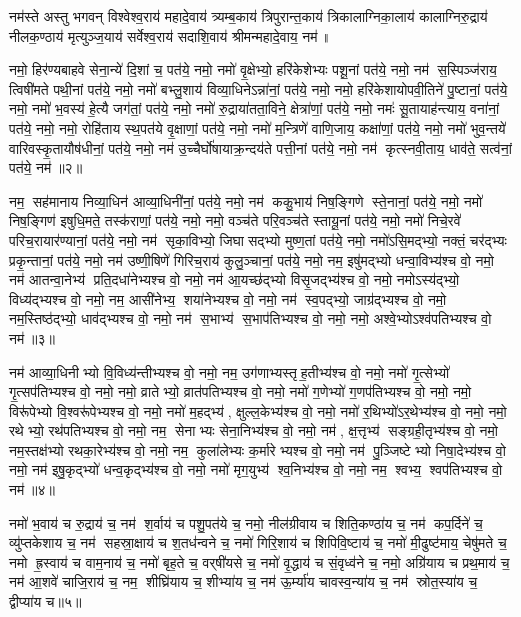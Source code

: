  
\lbrack नम॑स्ते अस्तु भगवन् विश्वेश्व॒राय॑ महादे॒वाय॑ त्र्यम्ब॒काय॑ त्रिपुरान्त॒काय॑ त्रिका\lbrack ला\rbrack ग्निका॒लाय॑ कालाग्निरु॒द्राय॑ नीलक॒ण्ठाय॑ मृत्युञ्ज॒याय॑ सर्वेश्व॒राय॑ सदाशि॒वाय॑ श्रीमन्महादे॒वाय॒ नम॑॥\rbrack

नमो॒ हिर॑ण्यबाहवे सेना॒न्ये॑ दि॒शां च॒ पत॑ये॒ नमो॒ नमो॑ वृ॒क्षेभ्यो॒ हरि॑केशेभ्यः पशू॒नां पत॑ये॒ नमो॒ नम॑ स॒स्पिञ्ज॑राय॒ त्विषी॑मते पथी॒नां पत॑ये॒ नमो॒ नमो॑ बभ्लु॒शाय॑ विव्या॒धिने\-ऽन्ना॑नां॒ पत॑ये॒ नमो॒ नमो॒ हरि॑केशायोपवी॒तिने॑ पु॒ष्टानां॒ पत॑ये॒ नमो॒ नमो॑ भ॒वस्य॑ हे॒त्यै जग॑तां॒ पत॑ये॒ नमो॒ नमो॑ रु॒द्राया॑तता॒विने॒ क्षेत्रा॑णां॒ पत॑ये॒ नमो॒ नमः॑ सू॒तायाह॑न्त्याय॒ वना॑नां॒ पत॑ये॒ नमो॒ नमो॒ रोहि॑ताय स्थ॒पत॑ये वृ॒क्षाणां॒ पत॑ये॒ नमो॒ नमो॑ म॒न्त्रिणे॑ वाणि॒जाय॒ कक्षा॑णां॒ पत॑ये॒ नमो॒ नमो॑ भुव॒न्तये॑ वारिवस्कृ॒तायौष॑धीनां॒ पत॑ये॒ नमो॒ नम॑ उ॒च्चैर्घो॑षा\-याक्र॒न्दय॑ते पत्ती॒नां पत॑ये॒ नमो॒ नम॑ कृत्स्नवी॒ताय॒ धाव॑ते॒ सत्व॑नां॒ पत॑ये॒ नम॑॥२॥ 


नम॒ सह॑मानाय निव्या॒धिन॑ आव्या॒धिनी॑नां॒ पत॑ये॒ नमो॒ नम॑ ककु॒भाय॑ निष॒ङ्गिणे स्ते॒नानां॒ पत॑ये॒ नमो॒ नमो॑ निष॒ङ्गिण॑ इषुधि॒मते॒ तस्क॑राणां॒ पत॑ये॒ नमो॒ नमो॒ वञ्च॑ते परि॒वञ्च॑ते स्तायू॒नां पत॑ये॒ नमो॒ नमो॑ निचे॒रवे॑ परिच॒रायार॑ण्यानां॒ पत॑ये॒ नमो॒ नम॑ सृका॒विभ्यो॒ जिघासद्भ्यो मुष्ण॒तां पत॑ये॒ नमो॒ नमो॑ऽसि॒मद्भ्यो॒ नक्तं॒ चर॑द्भ्यः प्रकृ॒न्तानां॒ पत॑ये॒ नमो॒ नम॑ उष्णी॒षिणे॑ गिरिच॒राय॑ कुलु॒ञ्चानां॒ पत॑ये॒ नमो॒ नम॒ इषु॑मद्भ्यो धन्वा॒विभ्य॑श्च वो॒ नमो॒ नम॑ आतन्वा॒नेभ्य॑ प्रति॒दधा॑नेभ्यश्च वो॒ नमो॒ नम॑ आ॒यच्छ॑द्भ्यो विसृ॒जद्भ्य॑श्च वो॒ नमो॒ नमोऽस्य॑द्भ्यो॒ विध्य॑द्भ्यश्च वो॒ नमो॒ नम॒ आसी॑नेभ्य॒ शया॑नेभ्यश्च वो॒ नमो॒ नम॑ स्व॒पद्भ्यो॒ जाग्र॑द्भ्यश्च वो॒ नमो॒ नम॒स्तिष्ठ॑द्भ्यो॒ धाव॑द्भ्यश्च वो॒ नमो॒ नम॑ स॒भाभ्य॑ स॒भाप॑तिभ्यश्च वो॒ नमो॒ नमो॒ अश्वे॒भ्योऽश्व॑पतिभ्यश्च वो॒ नम॑॥३॥ 

नम॑ आव्या॒धिनीभ्यो वि॒विध्य॑न्तीभ्यश्च वो॒ नमो॒ नम॒ उग॑णाभ्यस्तृ\-ह॒तीभ्य॑श्च वो॒ नमो॒ नमो॑ गृ॒त्सेभ्यो॑ गृ॒त्सप॑तिभ्यश्च वो॒ नमो॒ नमो॒ व्रातेभ्यो॒ व्रात॑पतिभ्यश्च वो॒ नमो॒ नमो॑ ग॒णेभ्यो॑ ग॒णप॑तिभ्यश्च वो॒ नमो॒ नमो॒ विरू॑पेभ्यो वि॒श्वरू॑पेभ्यश्च वो॒ नमो॒ नमो॑ म॒हद्भ्य॑, क्षुल्ल॒केभ्य॑श्च वो॒ नमो॒ नमो॑ र॒थिभ्यो॑ऽर॒थेभ्य॑श्च वो॒ नमो॒ नमो॒ रथेभ्यो॒ रथ॑पतिभ्यश्च वो॒ नमो॒ नम॒ सेनाभ्यः सेना॒निभ्य॑श्च वो॒ नमो॒ नम॑, क्ष॒त्तृभ्य॑ सङ्ग्रही॒तृभ्य॑श्च वो॒ नमो॒ नम॒स्तक्ष॑भ्यो रथका॒रेभ्य॑श्च वो॒ नमो॒ नम॒ कुला॑लेभ्यः क॒र्मारेभ्यश्च वो॒ नमो॒ नम॑ पु॒ञ्जिष्टेभ्यो निषा॒देभ्य॑श्च वो॒ नमो॒ नम॑ इषु॒कृद्भ्यो॑ धन्व॒कृद्भ्य॑श्च वो॒ नमो॒ नमो॑ मृग॒युभ्य॑ श्व॒निभ्य॑श्च वो॒ नमो॒ नम॒ श्वभ्य॒ श्वप॑तिभ्यश्च वो॒ नम॑॥४॥ 

नमो॑ भ॒वाय॑ च रु॒द्राय॑ च॒ नम॑ श॒र्वाय॑ च पशु॒पत॑ये च॒ नमो॒ नील॑ग्रीवाय च शिति॒कण्ठा॑य च॒ नम॑ कप॒र्दिने॑ च॒ व्यु॑प्तकेशाय च॒ नम॑ सहस्रा॒क्षाय॑ च श॒तध॑न्वने च॒ नमो॑ गिरि॒शाय॑ च शिपिवि॒ष्टाय॑ च॒ नमो॑ मी॒ढुष्ट॑माय॒ चेषु॑मते च॒ नमो ह्र॒स्वाय॑ च वाम॒नाय॑ च॒ नमो॑ बृह॒ते च॒ वर्‌षी॑यसे च॒ नमो॑ वृ॒द्धाय॑ च सं॒वृध्व॑ने च॒ नमो॒ अग्रि॑याय च प्रथ॒माय॑ च॒ नम॑ आ॒शवे॑ चाजि॒राय॑ च॒ नम॒ शीघ्रि॑याय च॒ शीभ्या॑य च॒ नम॑ ऊ॒र्म्या॑य चावस्व॒न्या॑य च॒ नम॑ स्रोत॒स्या॑य च॒ द्वीप्या॑य च॥५॥ 

